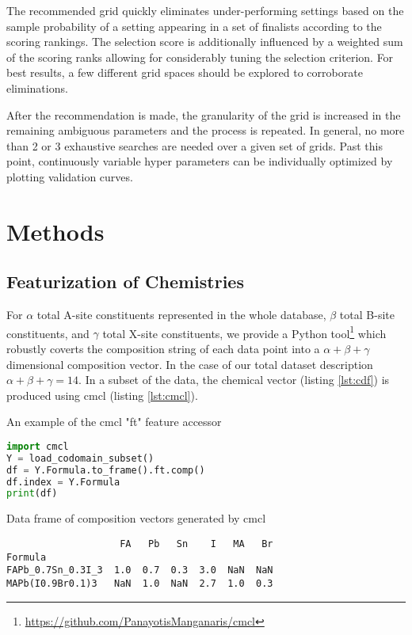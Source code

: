 The recommended grid quickly eliminates under-performing settings based on the sample probability of a setting appearing in a set of finalists according to the scoring rankings.
The selection score is additionally influenced by a weighted sum of the scoring ranks allowing for considerably tuning the selection criterion.
 For best results, a few different grid spaces should be explored to corroborate eliminations.

After the recommendation is made, the granularity of the grid is increased in the remaining ambiguous parameters and the process is repeated.
In general, no more than 2 or 3 exhaustive searches are needed over a given set of grids.
Past this point, continuously variable hyper parameters can be individually optimized by plotting validation curves.

\section{Methods}
\label{sec:org0b61df4}
\subsection{Featurization of Chemistries}
\label{sec:orge40c1c6}
For \(\alpha\) total A-site constituents represented in the whole database, \(\beta\) total B-site constituents, and \(\gamma\) total X-site constituents, we provide a Python tool\footnote{\url{https://github.com/PanayotisManganaris/cmcl}\label{org5c87981}} which robustly coverts the composition string of each data point into a \(\alpha + \beta + \gamma\) dimensional composition vector.
In the case of our total dataset description \(\alpha + \beta + \gamma = 14\).
\autocite{yang-2022-high-throug}
In a subset of the data, the chemical vector (listing \ref{lst:cdf}) is produced using cmcl (listing \ref{lst:cmcl}).

\begin{ZZlisting}
  \caption{\label{lst:cmcl} An example of the cmcl "ft" feature accessor}
  \begin{CenteredBox}
    \begin{lstlisting}[language=python]
import cmcl
Y = load_codomain_subset()
df = Y.Formula.to_frame().ft.comp()
df.index = Y.Formula
print(df)
    \end{lstlisting}
  \end{CenteredBox}
\end{ZZlisting}

\begin{ZZlisting}
  \caption{\label{lst:cdf} Data frame of composition vectors generated by cmcl}
  \begin{CenteredBox}
    \begin{lstlisting}
                    FA   Pb   Sn    I   MA   Br
Formula                                        
FAPb_0.7Sn_0.3I_3  1.0  0.7  0.3  3.0  NaN  NaN
MAPb(I0.9Br0.1)3   NaN  1.0  NaN  2.7  1.0  0.3
    \end{lstlisting}
  \end{CenteredBox}
\end{ZZlisting}

